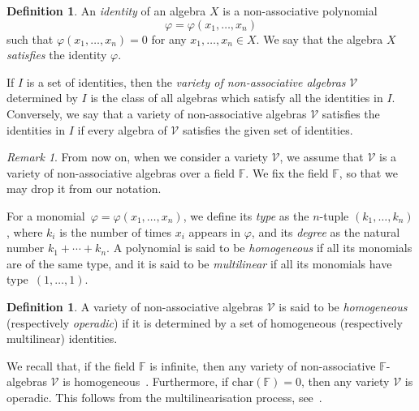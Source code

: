 \documentclass[reqno,a4paper]{amsart}
\theoremstyle{plain}
\theoremstyle{definition}
\newtheorem{definition}[subsection]{Definition}
\theoremstyle{remark}
\newtheorem{remark}[subsection]{Remark}
\numberwithin{equation}{section}
\newcommand{\F}{\mathbb{F}}
\newcommand{\V}{\mathcal{V}}
\begin{document}
\begin{definition}\label{def identity variety}
An \emph{identity} of an algebra $X$ is a non-associative polynomial
\[
\varphi=\varphi(x_1,\ldots,x_n)
\]
such that $\varphi(x_1,\ldots,x_n)=0$ for any $x_1,\ldots,x_n \in X$. We say that the algebra $X$ \emph{satisfies} the identity $\varphi$.
\end{definition}

If $I$ is a set of identities, then the \emph{variety of non-associative algebras} $\V$ determined by $I$ is the class of all algebras which satisfy all the identities in $I$. Conversely, we say that a variety of non-associative algebras $\V$ satisfies the identities in $I$ if every algebra of $\V$ satisfies the given set of identities. 

\begin{remark}
From now on, when we consider a variety $\V$, we assume that $\V$ is a variety of non-associative algebras over a field $\F$. We fix the field $\F$, so that we may drop it from our notation.
\end{remark}

For a monomial~$\varphi=\varphi(x_1,\ldots,x_n)$, we define its \emph{type} as the $n$-tuple $(k_1, \ldots , k_n)$, where $k_i$ is the number of times $x_i$ appears in $\varphi$, and its \emph{degree} as the natural number $k_1 + \cdots + k_n$. A polynomial is said to be \emph{homogeneous} if all its monomials are of the same type, and it is said to be \emph{multilinear} if all its monomials have type~$(1,\ldots,1)$.

\begin{definition}
A variety of non-associative algebras $\V$ is said to be \emph{homogeneous} (respectively \emph{operadic}) if it is determined by a set of homogeneous (respectively multilinear) identities.
\end{definition}

We recall that, if the field $\F$ is infinite, then any variety of non-associative $\F$-algebras $\V$ is homogeneous~\cite{hmg}. Furthermore, if $\mathrm{char}(\F)=0$, then any variety $\V$ is operadic. This follows from the multilinearisation process, see~\cite[Corollary 3.7]{Osborn}.
\end{document}

